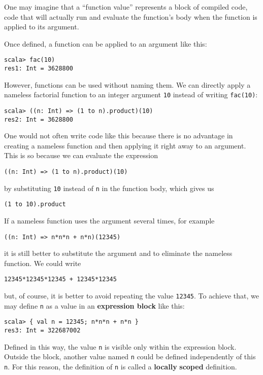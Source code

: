One may imagine that a ``function value'' represents a block\emph{
}of compiled code, \textemdash{} code that will actually run and evaluate
the function's body when the function is applied to its argument.

Once defined, a function can be applied to an argument like this:
\begin{lstlisting}
scala> fac(10)
res1: Int = 3628800
\end{lstlisting}

However, functions can be used without naming them. We can directly
apply a nameless factorial function to an integer argument \lstinline!10!
instead of writing \lstinline!fac(10)!:
\begin{lstlisting}
scala> ((n: Int) => (1 to n).product)(10)
res2: Int = 3628800
\end{lstlisting}
One would not often write code like this because there is no advantage
in creating a nameless function and then applying it right away to
an argument. This is so because we can evaluate the expression
\begin{lstlisting}
((n: Int) => (1 to n).product)(10)
\end{lstlisting}
by substituting \lstinline!10! instead of \lstinline!n! in the function
body, which gives us
\begin{lstlisting}
(1 to 10).product
\end{lstlisting}

If a nameless function uses the argument several times, for example
\begin{lstlisting}
((n: Int) => n*n*n + n*n)(12345)
\end{lstlisting}
it is still better to substitute the argument and to eliminate the
nameless function. We could write
\begin{lstlisting}
12345*12345*12345 + 12345*12345
\end{lstlisting}
but, of course, it is better to avoid repeating the value \lstinline!12345!.
To achieve that, we may define \texttt{}\lstinline!n! as a value
in an \textbf{expression block} like this:
\begin{lstlisting}
scala> { val n = 12345; n*n*n + n*n }
res3: Int = 322687002
\end{lstlisting}
Defined in this way, the value \lstinline!n! is visible only within
the expression block. Outside the block, another value named \lstinline!n!
could be defined independently of this \lstinline!n!. For this reason,
the definition of \lstinline!n! is called a \textbf{locally}
\textbf{scoped} definition.

